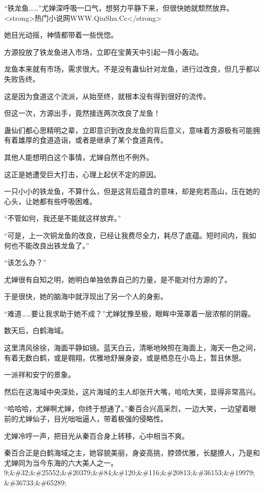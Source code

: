
\begin{this_body}

“铁龙鱼……”尤婵深呼吸一口气，想努力平静下来，但很快她就颓然放弃。<strong>热门小说网WWW.QiuShu.Cc</strong>

她目光动摇，神情都带着一些恍惚。

方源投放了铁龙鱼进入市场，立即在宝黄天中引起一阵小轰动。

龙鱼本来就有市场，需求很大。不是没有蛊仙针对龙鱼，进行过改良，但几乎都以失败告终。

这是因为食道这个流派，从始至终，就根本没有得到很好的流传。

但这一次，方源出手，竟然接连两次改良了龙鱼！

蛊仙们都心思精明之辈，立即意识到改良龙鱼的背后意义，意味着方源极有可能拥有着雄厚的食道造诣，或者是继承了某个食道真传。

其他人能想明白这个事情，尤婵自然也不例外。

这正是她遭受巨大打击，心理上起伏不定的原因。

一只小小的铁龙鱼，不算什么，但是这背后蕴含的意味，却是宛若高山，压在她的心头，让她都有些呼吸困难。

“不管如何，我还是不能就这样放弃。”

“可是，上一次铜龙鱼的改良，已经让我费尽全力，耗尽了底蕴。短时间内，我如何也不能改良出铁龙鱼了。”

“该怎么办？”

尤婵很有自知之明，她明白单独依靠自己的力量，是不能对付方源的了。

于是很快，她的脑海中就浮现出了另一个人的身影。

“难道……要让我求助于她不成？”尤婵犹豫至极，眼眸中笼罩着一层浓郁的阴霾。

数天后，白鹤海域。

这里清风徐徐，海面平静如镜。蓝天白云，清晰地映照在海面上，海天一色之间，有着无数白鹤，或是翱翔，优雅地舒展身姿，或是栖息在小岛上，暂且休憩。

一派祥和安宁的景象。

然后在这海域中央深处，这片海域的主人却张开大嘴，哈哈大笑，显得非常高兴。

“哈哈哈，尤婵啊尤婵，你终于想通了。”秦百合兴高采烈，一边大笑，一边望着眼前的尤婵仙子，目光咄咄逼人，带着极强的侵略性。

尤婵冷哼一声，把目光从秦百合身上转移，心中相当不爽。

秦百合正是白鹤海域之主，她容貌美丽，身姿高挑，脖颈优雅，长腿撩人，乃是和尤婵同为当今东海的六大美人之一。9;\&\#32;\&\#25552;\&\#20379;\&\#84;\&\#120;\&\#116;\&\#20813;\&\#36153;\&\#19979;\&\#36733;\&\#65289;


\end{this_body}
